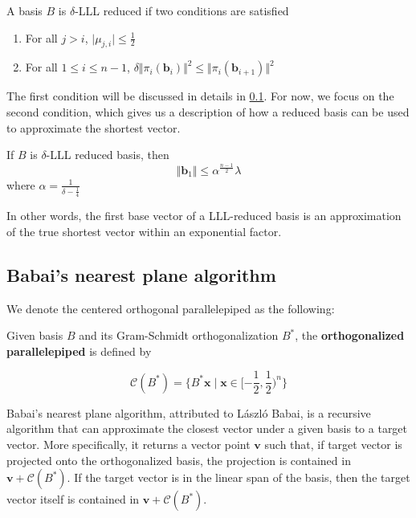 \begin{definition}
    A basis $B$ is $\delta$-LLL reduced if two conditions are satisfied
    \begin{enumerate}
    \item For all $j > i$, $\vert\mu_{j, i}\vert \leq \frac{1}{2}$
    \item For all $1 \leq i \leq n-1$, $\delta\Vert \pi_i(\mathbf{b}_i)\Vert^2 \leq \Vert\pi_i(\mathbf{b}_{i+1})\Vert^2$
\end{enumerate}
\end{definition}

The first condition will be discussed in details in \ref{subsec:nearestplane}. For now, we focus on the second condition, which gives us a description of how a reduced basis can be used to approximate the shortest vector.

\begin{theorem}
    If $B$ is $\delta$-LLL reduced basis, then
    $$
    \Vert \mathbf{b}_1 \Vert \leq \alpha^\frac{n-1}{2} \lambda
    $$
    where $\alpha = \frac{1}{\delta - \frac{1}{4}}$
\end{theorem}

In other words, the first base vector of a LLL-reduced basis is an approximation of the true shortest vector within an exponential factor.

\subsection{Babai's nearest plane algorithm}\label{subsec:nearestplane}
We denote the centered orthogonal parallelepiped as the following:

\begin{definition}
    Given basis $B$ and its Gram-Schmidt orthogonalization $B^\ast$, the \textbf{orthogonalized parallelepiped} is defined by

    $$
    \mathcal{C}(B^\ast) = \{
        B^\ast \mathbf{x} \mid \mathbf{x} \in [-\frac{1}{2}, \frac{1}{2})^n
    \}
    $$
\end{definition}

Babai's nearest plane algorithm, attributed to László Babai, is a recursive algorithm that can approximate the closest vector under a given basis to a target vector. More specifically, it returns a vector point $\mathbf{v}$ such that, if target vector is projected onto the orthogonalized basis, the projection is contained in $\mathbf{v} + \mathcal{C}(B^\ast)$. If the target vector is in the linear span of the basis, then the target vector itself is contained in $\mathbf{v} + \mathcal{C}(B^\ast)$.

